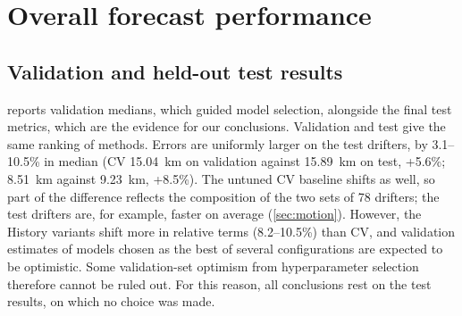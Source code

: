 \section{Overall forecast performance}\label{sec:overall}

\subsection{Validation and held-out test results}
 reports validation medians, which guided model selection, alongside the final test metrics, which are the evidence for our conclusions. Validation and test give the same ranking of methods. Errors are uniformly larger on the test drifters, by 3.1--10.5\% in median (CV \SI{15.04}{km} on validation against \SI{15.89}{km} on test, +5.6\%; \GBH{} \SI{8.51}{km} against \SI{9.23}{km}, +8.5\%). The untuned CV baseline shifts as well, so part of the difference reflects the composition of the two sets of 78 drifters; the test drifters are, for example, faster on average (\cref{sec:motion}). However, the History variants shift more in relative terms (8.2--10.5\%) than CV, and validation estimates of models chosen as the best of several configurations are expected to be optimistic. Some validation-set optimism from hyperparameter selection therefore cannot be ruled out. For this reason, all conclusions rest on the test results, on which no choice was made.

